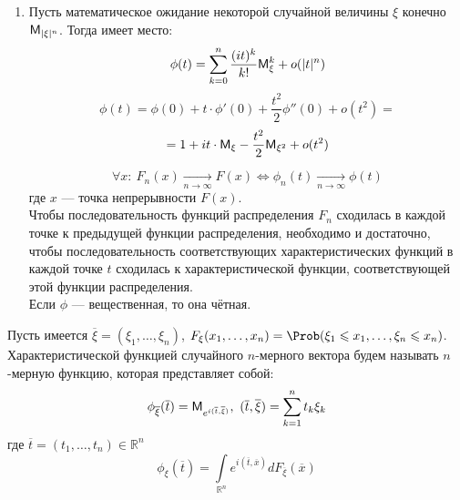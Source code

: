 \begin{enumerate}[wide, labelwidth=!, labelindent=0pt]
\item Пусть математическое ожидание некоторой случайной величины $\xi$ конечно $\mathsf{M}_{|\xi|^n}$. Тогда имеет место:
\[
	\phi(t) = \sum\limits_{k = 0}^{n} \frac{(it)^k}{k!} \mathsf{M}_{\xi}^k + o(|t|^n)
\]
\[
	\phi(t) = \phi(0) + t \cdot \phi'(0) + \frac{t^2}{2} \phi''(0) + o(t^2) = 
\]
\[
	= 1 + it \cdot \mathsf{M}_{\xi} - \frac{t^2}{2} \mathsf{M}_{\xi^2} + o(t^2)
\]

\begin{theorem}
	\[
		\forall x: \ F_n (x) \underset{n \to \infty}{\rightarrow} F(x) \Leftrightarrow \phi_n (t) \underset{n \to \infty}{\rightarrow} \phi(t)
	\]
где $x$ --- точка непрерывности $F(x)$. \\
Чтобы последовательность функций распределения $F_n$ сходилась в каждой точке к предыдущей функции распределения, необходимо и достаточно, чтобы последовательность соответствующих характеристических функций в каждой точке $t$ сходилась к характеристической функции, соответствующей этой функции распределения. \\
Если $\phi$ --- вещественная, то она чётная.
\end{theorem}
\end{enumerate}
\begin{definition}
	Пусть имеется $\overline{\xi} = (\xi_1, \ldots, \xi_n)$, $F_{\xi} (x_1, \ldots, x_n) = \Prob(\xi_1 \leqslant x_1, \ldots, \xi_n \leqslant x_n)$. Характеристической функцией случайного $n$-мерного вектора будем называть $n$-мерную функцию, которая представляет собой:
\[
	\phi_{\overline{\xi}} (\overline{t}) = \mathsf{M}_{e^{i(\overline{t}, \overline{\xi})}}, \ (\overline{t}, \overline{\xi}) = \sum\limits_{k = 1}^{n} t_k \xi_k
\]
где $\overline{t} = (t_1, \ldots, t_n) \in \mathbb{R}^n$
\[
	\phi_{\xi} (\overline{t}) = \int\limits_{\mathbb{R}^n} e^{i(\overline{t}, \overline{x})} d F_{\overline{\xi}} (\overline{x})
\]
\end{definition}
